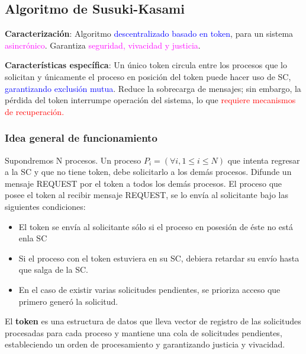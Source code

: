 \subsection{Algoritmo de Susuki-Kasami}

\textbf{Caracterización}: Algoritmo \textcolor{blue}{descentralizado basado en token}, para un sistema \textcolor{magenta}{asincrónico}. Garantiza \textcolor{magenta}{seguridad, vivacidad y justicia}.

\textbf{Características específica}: Un único token circula entre los procesos que lo solicitan y únicamente el proceso en posición del token puede hacer uso de SC, \textcolor{blue}{garantizando exclusión mutua}. Reduce la sobrecarga de mensajes; sin embargo, la pérdida del token interrumpe operación del sistema, lo que \textcolor{red}{requiere mecanismos de recuperación.}

\subsubsection{Idea general de funcionamiento}

Supondremos N procesos. Un proceso $P_i = (\forall i, 1 \leq i \leq N)$ que intenta regresar a la SC y que no tiene token, debe solicitarlo a los demás procesos. Difunde un mensaje REQUEST por el token a todos los demás procesos. El proceso que posee el token al recibir mensaje REQUEST, se lo envía al solicitante bajo las siguientes condiciones: 
\begin{itemize}
    \item El token se envía al solicitante sólo si el proceso en posesión de éste no está enla SC
    \item Si el proceso con el token estuviera en su SC, debiera retardar su envío hasta que salga de la SC.
    \item En el caso de existir varias solicitudes pendientes, se prioriza acceso que primero generó la solicitud.
\end{itemize}

El \textbf{token} es una estructura de datos que lleva  vector de registro de las solicitudes procesadas para cada proceso y mantiene una cola de solicitudes pendientes, estableciendo un orden de procesamiento y garantizando justicia y vivacidad.

